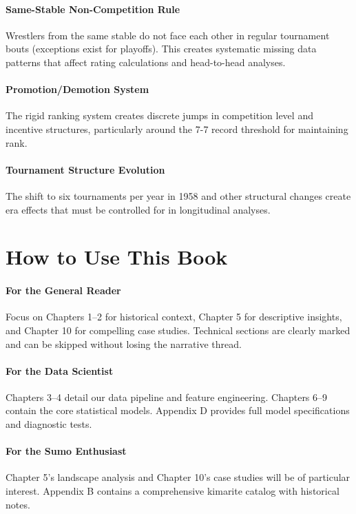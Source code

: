 \paragraph{Same-Stable Non-Competition Rule} Wrestlers from the same stable do not face each other in regular tournament bouts (exceptions exist for playoffs). This creates systematic missing data patterns that affect rating calculations and head-to-head analyses.

\paragraph{Promotion/Demotion System} The rigid ranking system creates discrete jumps in competition level and incentive structures, particularly around the 7-7 record threshold for maintaining rank.

\paragraph{Tournament Structure Evolution} The shift to six tournaments per year in 1958 and other structural changes create era effects that must be controlled for in longitudinal analyses.

\section*{How to Use This Book}

\paragraph{For the General Reader} Focus on Chapters 1--2 for historical context, Chapter 5 for descriptive insights, and Chapter 10 for compelling case studies. Technical sections are clearly marked and can be skipped without losing the narrative thread.

\paragraph{For the Data Scientist} Chapters 3--4 detail our data pipeline and feature engineering. Chapters 6--9 contain the core statistical models. Appendix D provides full model specifications and diagnostic tests.

\paragraph{For the Sumo Enthusiast} Chapter 5's landscape analysis and Chapter 10's case studies will be of particular interest. Appendix B contains a comprehensive kimarite catalog with historical notes.


